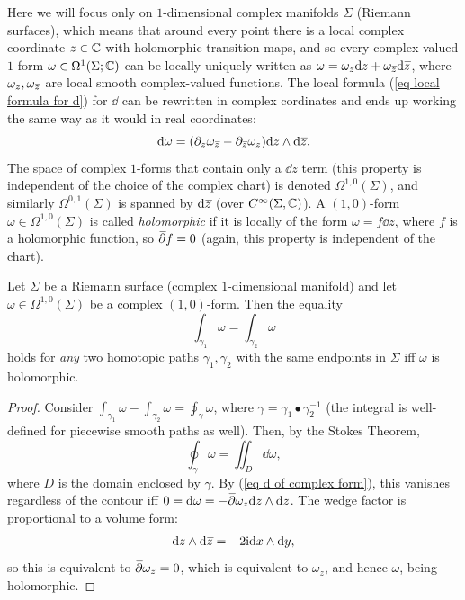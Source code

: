 \begin{rem}
    Here we will focus only on $1$-dimensional complex manifolds $\Sigma$ (Riemann surfaces), which means that around every point there is a local complex coordinate $z\in \mathbb{C}$ with holomorphic transition maps, and so every complex-valued $1$-form $\omega\in\Omega^1(\Sigma;\mathbb{C})$ can be locally uniquely written as $\omega=\omega_z \dd z+\omega_{\wb{z}} \dd \wb{z}$, where $\omega_z,\omega_{\wb{z}}$ are local smooth complex-valued functions.
    The local formula (\ref{eq local formula for d}) for $\dd$ can be rewritten in complex cordinates and ends up working the same way as it would in real coordinates:
    \[\dd\omega=(\partial_{z} \omega_{\wb z}-\partial_{\wb z} \omega_{z})\dd z\wedge \dd \wb{z}.\label{eq d of complex form}\]
    The space of complex $1$-forms that contain only a $\dd z$ term (this property is independent of the choice of the complex chart) is denoted $\Omega^{1,0}(\Sigma)$, and similarly $\Omega^{0,1}(\Sigma)$ is spanned by $\dd \wb{z}$ (over $C^\infty(\Sigma,\mathbb{C})$). A $(1,0)$-form $\omega\in\Omega^{1,0}(\Sigma)$ is called \emph{holomorphic} if it is locally of the form $\omega=f\dd z$, where $f$ is a holomorphic function, so $\wb\partial f=0$ (again, this property is independent of the chart).
\end{rem}
\begin{cor}
    Let $\Sigma$ be a Riemann surface (complex $1$-dimensional manifold) and let $\omega\in\Omega^{1,0}(\Sigma)$ be a complex $(1,0)$-form. Then the equality
    \[\int_{\gamma_1}\omega=\int_{\gamma_2}\omega\]
    holds for \emph{any} two homotopic paths $\gamma_1,\gamma_2$ with the same endpoints in $\Sigma$ iff $\omega$ is holomorphic.
\end{cor}
\begin{proof}
    Consider $\int_{\gamma_1}\omega-\int_{\gamma_2}\omega=\oint_{\gamma}\omega$, where $\gamma=\gamma_1\bullet \gamma_2^{-1}$ (the integral is well-defined for piecewise smooth paths as well). Then, by the Stokes Theorem, 
    \[\oint_\gamma \omega=\iint_D \dd\omega,\]
    where $D$ is the domain enclosed by $\gamma$.
    By (\ref{eq d of complex form}), this vanishes regardless of the contour iff $0=\dd \omega=-\wb\partial\omega_z \dd z\wedge\dd\wb{z}$. The wedge factor is proportional to a volume form:
    \[\dd z\wedge\dd {\wb z}=-2\i \dd x\wedge\dd y,\]
    so this is equivalent to $\wb\partial\omega_z=0$, which is equivalent to $\omega_z$, and hence $\omega$, being holomorphic.
\end{proof}


